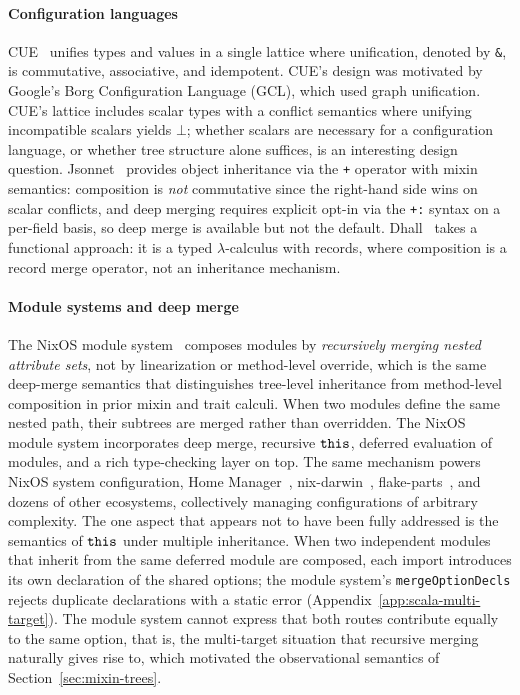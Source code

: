 \paragraph{Configuration languages}
CUE~\cite{cue2019} unifies types and values in a single lattice
where unification, denoted by \texttt{\&}, is commutative, associative, and
idempotent.
CUE's design was motivated by Google's Borg Configuration
Language (GCL), which used graph unification.
CUE's lattice includes scalar types with a conflict
semantics where unifying incompatible scalars yields $\bot$; whether
scalars are necessary for a configuration language, or whether
tree structure alone suffices, is an interesting design question.
Jsonnet~\cite{jsonnet} provides object inheritance via the
\texttt{+} operator with mixin semantics: composition is
\emph{not} commutative since the right-hand side wins on scalar
conflicts, and deep merging requires explicit opt-in via the \texttt{+:}
syntax on a per-field basis, so deep merge is
available but not the default.
Dhall~\cite{dhall2017} takes a functional approach: it is a typed
$\lambda$-calculus with records, where composition is a record merge
operator, not an inheritance mechanism.

\paragraph{Module systems and deep merge}
The NixOS module system~\cite{dolstra2010-nixos,nixosmodules}
composes modules by \emph{recursively merging nested attribute sets},
not by linearization or method-level override, which is the same deep-merge
semantics that distinguishes tree-level inheritance from method-level
composition in prior mixin and trait calculi.
When two modules define the same nested path, their subtrees are
merged rather than overridden.
The NixOS module system incorporates deep merge,
recursive $\mathtt{this}$, deferred evaluation of modules, and a
rich type-checking layer on top.
The same mechanism powers
NixOS system configuration, Home
Manager~\cite{homemanager}, nix-darwin~\cite{nixdarwin},
flake-parts~\cite{flakeparts}, and dozens of other ecosystems,
collectively managing configurations of arbitrary complexity.
The one aspect that appears not to have been fully addressed is the
semantics of $\mathtt{this}$ under multiple inheritance.
When two independent modules that inherit from the same
deferred module are composed, each import introduces its own
declaration of the shared options; the module system's
\texttt{merge\-Option\-Decls} rejects duplicate declarations
with a static error (Appendix~\ref{app:scala-multi-target}).
The module system cannot express that both routes contribute
equally to the same option, that is, the multi-target situation that
recursive merging naturally gives rise to, which motivated the
observational semantics of Section~\ref{sec:mixin-trees}.

